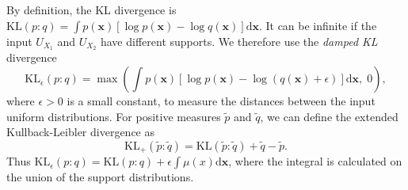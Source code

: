 \documentclass{article}
\newcommand{\kl}{\mathrm{KL}}
\newcommand{\dx}{\mathrm{d}\bm{x}}
\begin{document}
By definition, the KL divergence is
$\kl(p : q) = \int p(\bm{x}) \left[\log{p}(\bm{x})-\log{q}(\bm{x})\right]\dx$.
It can be infinite if the input $U_{X_1}$ and $U_{X_2}$ have different supports.
We therefore use the \emph{damped KL} divergence
\begin{equation}
\kl_{\epsilon}(p : q) =
\max\left(
\int p(\bm{x}) \left[\log{p}(\bm{x})-\log\left(q(\bm{x})+\epsilon\right) \right]\dx,
\;0 \right),
\end{equation}
where $\epsilon>0$ is a small constant, to measure the distances between the
input uniform distributions.
For positive measures $\tilde{p}$ and $\tilde{q}$, we can define the extended Kullback-Leibler divergence as
\begin{equation}
\kl_{+}(\tilde{p}:\tilde{q}) = \kl(\tilde{p}:\tilde{q})+\tilde{q}-\tilde{p}.
\end{equation}
Thus $\kl_{\epsilon}(p : q)=\kl(p:q)+\epsilon \int \mu(x)\dx$, where the integral is calculated on the union of the support distributions.
\end{document}
